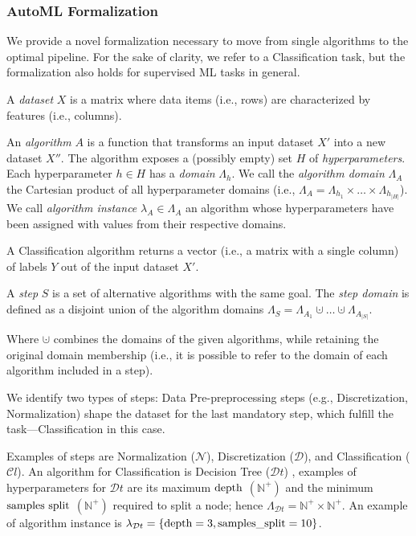 \subsubsection{AutoML Formalization}
We provide a novel formalization necessary to move from single algorithms to the optimal pipeline.
For the sake of clarity, we refer to a Classification task, but the formalization also holds for supervised ML tasks in general. %

\begin{definition}[Dataset]
A \emph{dataset} $X$ is a matrix where data items (i.e., rows) are characterized by features (i.e., columns).
\end{definition}

\begin{definition}[Algorithm]
An \emph{algorithm} $A$ is a function that transforms an input dataset $X'$ into a new dataset $X''$.
The algorithm exposes a (possibly empty) set $H$ of \emph{hyperparameters}.
Each hyperparameter $h \in H$ has a \emph{domain} $\Lambda_h$.
We call the \emph{algorithm domain} $\Lambda_A$ the Cartesian product of all hyperparameter domains (i.e., $\Lambda_A = \Lambda_{h_1} \times \ldots \times \Lambda_{h_{|H|}}$).
We call \emph{algorithm instance} $\lambda_A \in \Lambda_A$ an algorithm whose hyperparameters have been assigned with values from their respective domains.
\end{definition}

A Classification algorithm returns a vector (i.e., a matrix with a single column) of labels $Y$ out of the input dataset $X'$.

\begin{definition}[Step]
A \emph{step} $S$ is a set of alternative algorithms with the same goal.
The \emph{step domain} is defined as a disjoint union of the algorithm domains $\Lambda_S = \Lambda_{A_1} \cupdot \ldots \cupdot \Lambda_{A_{|S|}}$.
\end{definition}

Where $\cupdot$ combines the domains of the given algorithms, while retaining the original domain membership (i.e., it is possible to refer to the domain of each algorithm included in a step).

We identify two types of steps: Data Pre-preprocessing steps (e.g., Discretization, Normalization) shape the dataset for the last mandatory step, which fulfill the task---Classification in this case.

\begin{example}
Examples of steps are Normalization ($\mathcal{N}$), Discretization ($\mathcal{D}$), and Classification ($\mathcal{C}l$). 
An algorithm for Classification is Decision Tree  ($\mathcal{D}t$) \cite{DBLP:books/wa/BreimanFOS84},
examples of hyperparameters for $\mathcal{D}t$ are its maximum $\textup{depth}$ $(\mathbb{N}^+)$ and the minimum $\textup{samples split}$ $(\mathbb{N}^+)$ required to split a node; hence $\Lambda_{\mathcal{D}t} = \mathbb{N}^+ \times \mathbb{N}^+$.
An example of algorithm instance is $\lambda_{\mathcal{D}t}= \{ \textup{depth}=3,\textup{samples\_split}=10 \}$.
\end{example}

